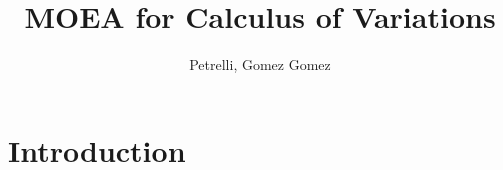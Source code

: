 \documentclass{article}
\title{MOEA for Calculus of Variations}
\author{Petrelli, Gomez Gomez}
\date{}
\begin{document}
\maketitle

\section{Introduction}
\end{document}
